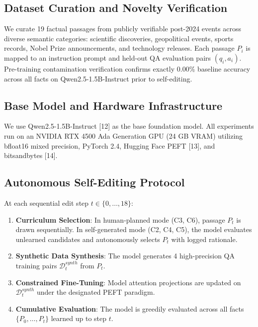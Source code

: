 \documentclass[10pt,journal,compsoc]{IEEEtran}
\begin{document}
\subsection{Dataset Curation and Novelty Verification}
We curate 19 factual passages from publicly verifiable post-2024 events across diverse semantic categories: scientific discoveries, geopolitical events, sports records, Nobel Prize announcements, and technology releases. Each passage $P_i$ is mapped to an instruction prompt and held-out QA evaluation pairs $(q_i, a_i)$. Pre-training contamination verification confirms exactly $0.00\%$ baseline accuracy across all facts on Qwen2.5-1.5B-Instruct prior to self-editing.

\subsection{Base Model and Hardware Infrastructure}
We use Qwen2.5-1.5B-Instruct [12] as the base foundation model. All experiments run on an NVIDIA RTX 4500 Ada Generation GPU (24 GB VRAM) utilizing bfloat16 mixed precision, PyTorch 2.4, Hugging Face PEFT [13], and bitsandbytes [14].

\subsection{Autonomous Self-Editing Protocol}
At each sequential edit step $t \in \{0, \dots, 18\}$:
\begin{enumerate}
    \item \textbf{Curriculum Selection}: In human-planned mode (C3, C6), passage $P_t$ is drawn sequentially. In self-generated mode (C2, C4, C5), the model evaluates unlearned candidates and autonomously selects $P_t$ with logged rationale.
    \item \textbf{Synthetic Data Synthesis}: The model generates 4 high-precision QA training pairs $\mathcal{D}_t^{synth}$ from $P_t$.
    \item \textbf{Constrained Fine-Tuning}: Model attention projections are updated on $\mathcal{D}_t^{synth}$ under the designated PEFT paradigm.
    \item \textbf{Cumulative Evaluation}: The model is greedily evaluated across all facts $\{P_0, \dots, P_t\}$ learned up to step $t$.
\end{enumerate}
\end{document}

